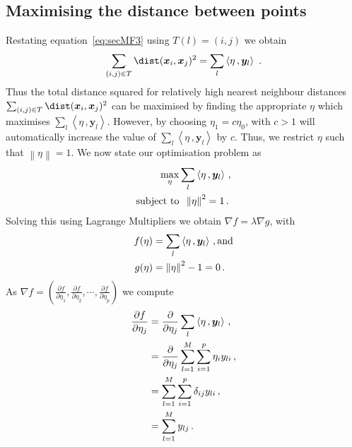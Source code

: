 \documentclass[a4paper,11pt]{article}
\begin{document}
\subsection{Maximising the distance between points}\label{sec:MathFrame2}
Restating equation~\eqref{eq:secMF3} using $T(l) = (i,j)$ we obtain
\begin{equation} \label{eq:secMF4}
    \sum_{(i,j) \in T}\dist(\bm{x}_i, \bm{x}_j)^2 = \sum_{l}\left\langle \eta\, ,  \bm{y}_{l} \right\rangle\, \, .
\end{equation}
Thus  the total distance squared for relatively high nearest neighbour distances $ \sum_{(i,j) \in T}\dist(\bm{x}_i, \bm{x}_j)^2$  can be maximised by finding the appropriate $\eta$ which maximises $\sum_{l}\left\langle \eta\, ,  \bm{y}_{l} \right\rangle$. However, by choosing $\eta_1 = c \eta_0 $, with $c >1$ will automatically increase the value of $\sum_{l}\left\langle \eta\, ,  \bm{y}_{l} \right\rangle$ by $c$. Thus, we restrict $\eta$ such that $\left \lVert \eta \right\rVert = 1$.  We now state our optimisation problem as
\begin{align} \label{eq:secMF5}
     \max_\eta & \sum_{l}\left\langle \eta\, ,  \bm{y}_{l} \right\rangle \, , \\
   \text{subject to} & \hspace{0.2cm}   \left \lVert \eta \right\rVert^2  = 1 \notag \, .
\end{align}
Solving this using Lagrange Multipliers we obtain $\nabla f  = \lambda \nabla g$, with
\begin{align}\label{eq:secMF6}
    f(\eta) & = \sum_{l}\left\langle \eta\, ,  \bm{y}_{l} \right\rangle  \, , \text{and} \\
    g(\eta)  & = \left \lVert \eta \right\rVert^2  - 1 = 0 \, . \notag
\end{align}
As $\nabla f = \left( \frac{\partial f}{\partial \eta_1},  \frac{\partial f}{\partial \eta_2},  \cdots, \frac{\partial f}{\partial \eta_p} \right)$ we compute
\begin{align}\label{eq:secMF7}
\frac{\partial f}{\partial \eta_j} & =  \frac{\partial }{\partial \eta_j}\sum_{l}\left\langle \eta\, ,  \bm{y}_{l} \right\rangle \, ,  \notag  \\
& = \frac{\partial }{\partial \eta_j} \sum_{l=1}^M \sum_{i=1}^p \eta_i y_{li} \, ,\notag \\
& = \sum_{l=1}^M \sum_{i=1}^p  \delta_{ij} y_{li} \, , \notag \\
& = \sum_{l=1}^M y_{lj} \, .
\end{align}
\end{document}
